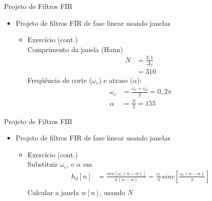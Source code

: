\begin{slide}{Projeto de Filtros FIR}
\begin{itemize}
   \item  Projeto de filtros FIR de fase linear usando janelas 
   \begin{itemize} 
      \item Exercício (cont.)\\
      Comprimento da janela (Hann)
      \begin{align*}
         N &= \frac{3,1}{\Delta_f}\\
            &= 310
      \end{align*}
      Freqüência de corte ($\omega_c$) e atraso ($\alpha$):
      \begin{align*}
         \omega_c &= \frac{\omega_s + \omega_p}{2}= 0,2\pi\\
         \alpha       &=\frac{N}{2}= 155
      \end{align*}
   \end{itemize}
\end{itemize}
\end{slide}

\begin{slide}{Projeto de Filtros FIR}
\begin{itemize}
   \item  Projeto de filtros FIR de fase linear usando janelas 
   \begin{itemize} 
      \item Exercício (cont.)\\
      Substituir $\omega_c$, e $\alpha$ em
      \begin{align*}
         h_d[n] &= \frac{sen[\omega_c(n-\alpha)]}{\pi(n-\alpha)} = \frac{\omega_c}{\pi}sinc\left [ \frac{\omega_c(n-\alpha)}{\pi}\right ] \\
       \end{align*}
      Calcular a janela $w[n]$, usando $N$
   \end{itemize}
\end{itemize}
\end{slide}

